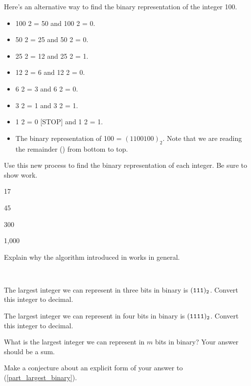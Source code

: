 \begin{exer}[\exerE] %
\label{exer_binary_alg_example}  
    Here's an alternative way to find the binary representation of the integer 100.

        \begin{itemize}
        \item 100  2 = 50 and 100  2 = 0.
        \item 50  2 = 25 and 50  2 = 0.
        \item 25  2 = 12 and 25  2 = 1.
        \item 12  2 = 6 and 12  2 = 0.
        \item 6  2 = 3 and 6  2 = 0.
        \item 3  2 = 1 and 3  2 = 1.
        \item 1  2 = 0 [STOP] and 1  2 = 1.
        \item The binary representation of 100 = $(1100100)_2$. Note that we are reading the remainder () from bottom to top.
        \end{itemize}
    Use this new process to find the binary representation of each integer. Be sure to show work.
        \begin{exerpart}           
            \item 17
            \item 45
            \item 300
            \item 1,000         
        \end{exerpart}
\end{exer}

\begin{exer}[\exerE] %
\label{exer_binary_alg_explain}
    Explain why the algorithm introduced in  works in general.  
\end{exer}

\begin{exer}[\exerE] %
\label{exer_largest_binary}
~
    \begin{apart}
        \item The largest integer we can represent in three bits in binary is $(\texttt{111})_2$.  Convert this integer to decimal.
        \item The largest integer we can represent in four bits in binary is $(\texttt{1111})_2$.  Convert this integer to decimal.
        \item  \label{part_largest_binary} What is the largest integer we can represent in $m$ bits in binary?  Your answer should be a sum.
        \item Make a conjecture about an explicit form of your answer to (\ref{part_largest_binary}). 
    \end{apart}
\end{exer}

